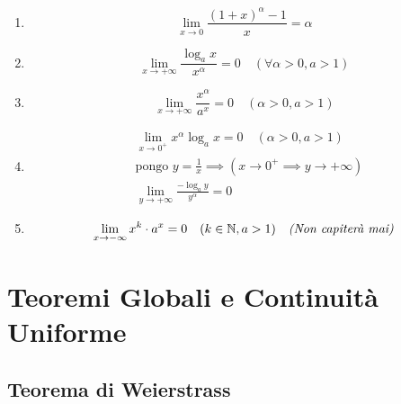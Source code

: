 \begin{enumerate}
    \item \[\lim_{ x \to 0 } \frac{(1 + x)^\alpha -1}{x}=\alpha\]
    
    \item \[\lim_{ x \to +\infty } \frac{\log_{a}x}{x^\alpha}=0 \quad (\forall \alpha>0, a>1)\]
    
    \item \[\lim_{ x \to +\infty } \frac{x^\alpha}{a^x}=0 \quad (\alpha>0, a>1)\]
    
    \item 
    \begin{align*}
    & \lim_{ x \to 0^+ } x^\alpha \log_{a}x = 0 \quad (\alpha>0, a>1) \\
    & \text{pongo } y=\frac{1}{x} \implies (x\to 0^+ \implies y\to +\infty) \\
    & \lim_{ y \to +\infty } \frac{-\log_{a}y}{y^\alpha}=0 
    \end{align*}
    
    \item \[\lim_{ x \to -\infty } x^k \cdot a^x = 0 \quad (k\in \mathbb{N}, a>1) \quad \text{\itshape(Non capiterà mai)}\]
\end{enumerate}

\section{Teoremi Globali e Continuità Uniforme}

\subsection{Teorema di Weierstrass}


